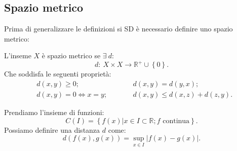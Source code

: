 \subsection{Spazio metrico}%
\label{sub:Spazio metrico}
Prima di generalizzare le definizioni si SD è necessario definire uno spazio metrico:
\begin{defn}
    L'inseme $X$ è spazio metrico se $\exists \ d:$ 
    \[
        d: \ X\times X \to \mathbb{R}^+ \cup \left\{0\right\}
    .\] 
    Che soddisfa le seguenti proprietà:
    \[\begin{aligned}
	& d(x, y) \ge 0; && \qquad d(x, y) = d(y, x); \\
	& d(x, y) = 0 \iff x = y; && \qquad d(x, y) \le d(x, z) + d(z, y)
    .\end{aligned}\]
\end{defn}
\noindent
\begin{exmp}
    Prendiamo l'insieme di funzioni:
    \[
	C(I) = \left\{f(x)| x \in I \subset \mathbb{R}; f \text{ continua}\right\}
    .\] 
    Possiamo definire una distanza $d$ come:
    \[
	d(f(x), g(x)) = \sup\limits_{x \in I}\left|f(x)- g(x)\right|
    .\] 
\end{exmp}
\noindent
